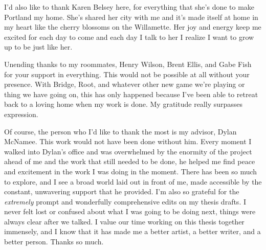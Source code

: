 \documentclass[12pt,twoside]{reedthesis}
\begin{document}
	
	I'd also like to thank Karen Belsey here, for everything that she's done to make Portland my home. She's shared her city with me and it's made itself at home in my heart like the cherry blossoms on the Willamette. Her joy and energy keep me excited for each day to come and each day I talk to her I realize I want to grow up to be just like her.
	
	Unending thanks to my roommates, Henry Wilson, Brent Ellis, and Gabe Fish for your support in everything. This would not be possible at all without your presence. With Bridge, Root, and whatever other new game we're playing or thing we have going on, this has only happened because I've been able to retreat back to a loving home when my work is done. My gratitude really surpasses expression.
	
	Of course, the person who I'd like to thank the most is my advisor, Dylan McNamee. This work would not have been done without him. Every moment I walked into Dylan's office and was overwhelmed by the enormity of the project ahead of me and the work that still needed to be done, he helped me find peace and excitement in the work I was doing in the moment. There has been so much to explore, and I see a broad world laid out in front of me, made accessible by the constant, unwavering support that he provided. I'm also so grateful for the \textit{extremely} prompt and wonderfully comprehensive edits on my thesis drafts. I never felt lost or confused about what I was going to be doing next, things were always clear after we talked. I value our time working on this thesis together immensely, and I know that it has made me a better artist, a better writer, and a better person. Thanks so much.
	
	
	
\end{document}
